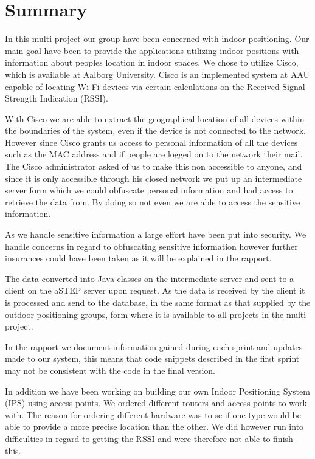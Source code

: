 \chapter*{Summary}
In this multi-project our group have been concerned with indoor positioning. Our main goal have been to provide the applications utilizing indoor positions with information about peoples location in indoor spaces. We chose to utilize Cisco, which is available at Aalborg University. Cisco is an implemented system at AAU capable of locating Wi-Fi devices via certain calculations on the Received Signal Strength Indication (RSSI).

With Cisco we are able to extract the geographical location of all devices within the boundaries of the system, even if the device is not connected to the network. However since Cisco grants us access to personal information of all the devices such as the MAC address and if people are logged on to the network their mail. The Cisco administrator asked of us to make this non accessible to anyone, and since it is only accessible through his closed network we put up an intermediate server form which we could obfuscate personal information and had access to retrieve the data from. By doing so not even we are able to access the sensitive information. 

As we handle sensitive information a large effort have been put into security. We handle concerns in regard to obfuscating sensitive information however further insurances could have been taken as it will be explained in the rapport.

The data converted into Java classes on the intermediate server and sent to a client on the aSTEP server upon request. As the data is received by the client it is processed and send to the database, in the same format as that supplied by the outdoor positioning groups, form where it is available to all projects in the multi-project.

In the rapport we document information gained during each sprint and updates made to our system, this means that code snippets described in the first sprint may not be consistent with the code in the final version.

In addition we have been working on building our own Indoor Positioning System (IPS) using access points. We ordered different routers and access points to work with. The reason for ordering different hardware was to se if one type would be able to provide a more precise location than the other. We did however run into difficulties in regard to getting the RSSI and were therefore not able to finish this.

